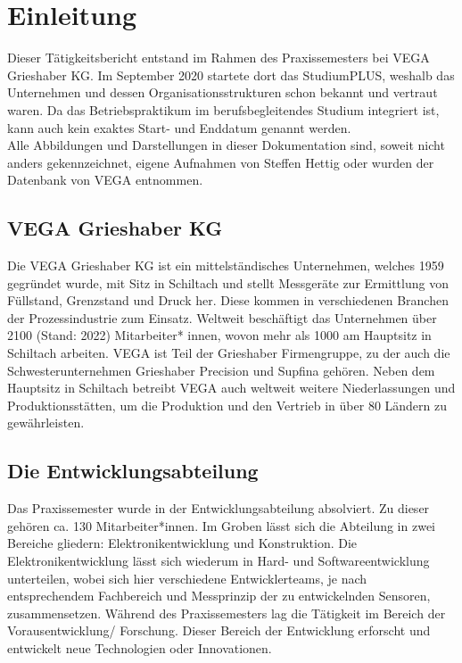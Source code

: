 \documentclass[
	letterpaper, %
	10pt, %
]{CSUniSchoolLabReport}
\begin{document}
\begin{spacing}{1.6}
\newpage
\large
\setcounter{page}{1}
\ofoot{\pagemark}
\tableofcontents
\renewcommand{\tablename}{Tab.}
\renewcommand{\figurename}{Abb.}
$ $
\newpage 
\section{Einleitung}
Dieser Tätigkeitsbericht entstand im Rahmen des Praxissemesters bei VEGA
Grieshaber KG. Im September 2020 startete dort das StudiumPLUS, weshalb das Unternehmen und dessen Organisationsstrukturen schon bekannt und vertraut waren. Da das Betriebspraktikum
im berufsbegleitendes Studium integriert ist, kann auch kein exaktes
Start- und Enddatum genannt werden.\\
Alle Abbildungen und Darstellungen in dieser Dokumentation sind, soweit nicht anders
gekennzeichnet, eigene Aufnahmen von Steffen Hettig oder wurden der Datenbank von
VEGA entnommen.
\subsection{VEGA Grieshaber KG}
Die VEGA Grieshaber KG ist ein mittelständisches Unternehmen, welches 1959 gegründet
wurde, mit Sitz in Schiltach und stellt Messgeräte zur Ermittlung von Füllstand, Grenzstand
und Druck her. Diese kommen in verschiedenen Branchen der Prozessindustrie
zum Einsatz. Weltweit beschäftigt das Unternehmen über 2100 (Stand: 2022) Mitarbeiter*
innen, wovon mehr als 1000 am Hauptsitz in Schiltach arbeiten. VEGA ist Teil der
Grieshaber Firmengruppe, zu der auch die Schwesterunternehmen Grieshaber Precision
und Supfina gehören.
Neben dem Hauptsitz in Schiltach betreibt VEGA auch weltweit weitere Niederlassungen
und Produktionsstätten, um die Produktion und den Vertrieb in über 80 Ländern zu
gewährleisten.

\subsection{Die Entwicklungsabteilung}
Das Praxissemester wurde in der Entwicklungsabteilung absolviert. Zu dieser gehören ca.
130 Mitarbeiter*innen. Im Groben lässt sich die Abteilung in zwei Bereiche gliedern:
Elektronikentwicklung und Konstruktion. Die Elektronikentwicklung lässt sich wiederum
in Hard- und Softwareentwicklung unterteilen, wobei sich hier verschiedene Entwicklerteams,
je nach entsprechendem Fachbereich und Messprinzip der zu entwickelnden Sensoren, zusammensetzen. Während des Praxissemesters lag die Tätigkeit im Bereich der Vorausentwicklung/ Forschung. Dieser Bereich der Entwicklung erforscht und entwickelt neue Technologien oder Innovationen.


\end{spacing}
\end{document}
